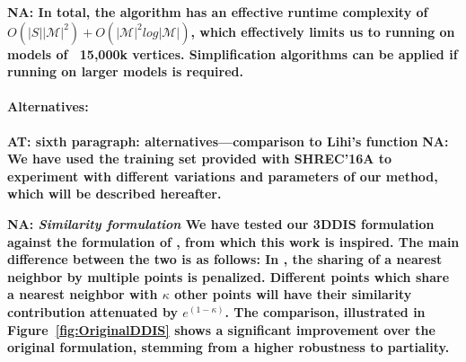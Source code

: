 \documentclass[10pt,twocolumn,letterpaper]{article}
\newcommand{\colornote}[3]{{\color{#1}\bf{#2: #3}\normalfont}}
\newcommand{\colornote}[3]{}
\newcommand {\ayellet}[1]{\colornote{blue}{AT}{#1}}
\newcommand {\nadav}[1]{\colornote{red}{NA}{#1}}
\begin{document}
 \nadav{In total, the algorithm has an effective runtime complexity of $O(|S||\mathcal{M}|^2) + O(|\mathcal{M}|^2log|\mathcal{M}|)$, which effectively limits us to running on models of ~15,000k vertices. Simplification algorithms can be applied if running on larger models is required.}
 
\paragraph{Alternatives:} 
\ayellet{sixth paragraph: alternatives---comparison to Lihi's function}
\nadav{ We have used the training set provided with SHREC'16A to experiment with different variations and parameters of our method, which will be described hereafter.}

\nadav{
\textit{Similarity formulation}	We have tested our 3DDIS formulation against the formulation of \cite{talmi2017template}, from which this work is inspired. 
The main difference between the two is as follows:
In \cite{talmi2017template}, the sharing of a nearest neighbor by multiple points is penalized. 
Different points which share a nearest neighbor with $\kappa$ other points will have their similarity contribution attenuated by $e^{(1-\kappa)}$. The comparison, illustrated in Figure~\ref{fig:OriginalDDIS} shows a significant improvement over the original formulation, stemming from a higher robustness to partiality.}
\end{document}
